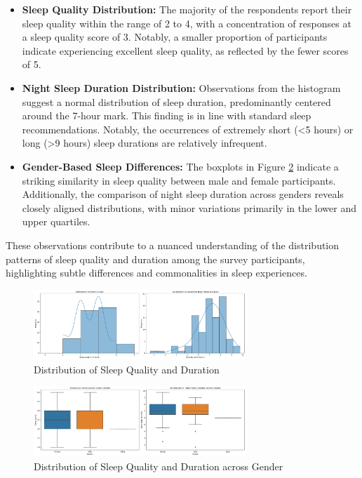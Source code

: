 \documentclass[conference]{IEEEtran}
\begin{document}
\begin{itemize}
    \item \textbf{Sleep Quality Distribution:} 
    The majority of the respondents report their sleep quality within the range of 2 to 4, with a concentration of responses at a sleep quality score of 3. Notably, a smaller proportion of participants indicate experiencing excellent sleep quality, as reflected by the fewer scores of 5.

    \item \textbf{Night Sleep Duration Distribution:}
    Observations from the histogram suggest a normal distribution of sleep duration, predominantly centered around the 7-hour mark. This finding is in line with standard sleep recommendations. Notably, the occurrences of extremely short (\textless 5 hours) or long (\textgreater 9 hours) sleep durations are relatively infrequent.

    \item \textbf{Gender-Based Sleep Differences:} 
    The boxplots in Figure \ref{fig:distsleepwm} indicate a striking similarity in sleep quality between male and female participants. Additionally, the comparison of night sleep duration across genders reveals closely aligned distributions, with minor variations primarily in the lower and upper quartiles.
\end{itemize}

These observations contribute to a nuanced understanding of the distribution patterns of sleep quality and duration among the survey participants, highlighting subtle differences and commonalities in sleep experiences.

\begin{figure}[ht]
    \centering
    \includegraphics[width=8cm]{images/distsleep.png}
    \caption{Distribution of Sleep Quality and Duration}
    \label{fig:distsleep}
  \end{figure}
  \begin{figure}[ht]
      \centering
      \includegraphics[width=8cm]{images/distsleepwm.png}
      \caption{Distribution of Sleep Quality and Duration across Gender}
      \label{fig:distsleepwm}
    \end{figure}
\end{document}
